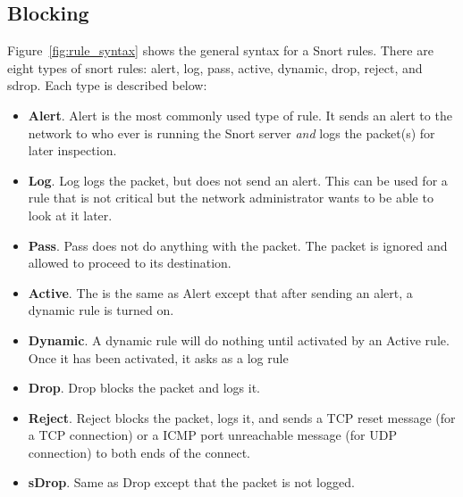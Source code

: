 
\subsection{Blocking}

Figure~\ref{fig:rule_syntax} shows the general syntax for a Snort rules. There are eight types of snort rules: alert, log, pass, active, dynamic, drop, reject, and sdrop. Each type is described below:

\begin{itemize}
    \item \textbf{Alert}.
        Alert is the most commonly used type of rule. It sends an alert to the
        network to who ever is running the Snort server \emph{and} logs the
        packet(s) for later inspection.

    \item \textbf{Log}.
        Log logs the packet, but does not send an alert.  This can be used for
        a rule that is not critical but the network administrator wants to be
        able to look at it later.

    \item \textbf{Pass}.
        Pass does not do anything with the packet. The packet is ignored and
        allowed to proceed to its destination.

    \item \textbf{Active}.
        The is the same as Alert except that after sending an alert, a dynamic
        rule is turned on.

    \item \textbf{Dynamic}.
        A dynamic rule will do nothing until activated by an Active rule. Once
        it has been activated, it asks as a log rule

    \item \textbf{Drop}.
        Drop blocks the packet and logs it.

    \item \textbf{Reject}.
        Reject blocks the packet, logs it, and sends a TCP reset message (for a
        TCP connection) or a ICMP port unreachable message (for UDP connection)
        to both ends of the connect.

    \item \textbf{sDrop}.
        Same as Drop except that the packet is not logged.
\end{itemize}

